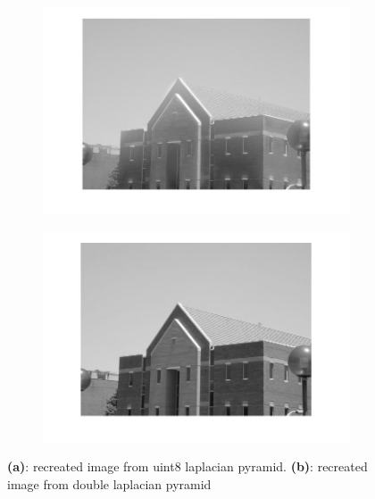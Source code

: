 \documentclass[a4paper]{iacas}
\begin{document}
\begin{figure}[!htbp]
	
	\begin{subfigure}[b]{0.48\textwidth}
		\includegraphics[width=\textwidth]{rec_1_building.jpg}
		\caption{}
		\label{fig:rec1b}
	\end{subfigure}
	\begin{subfigure}[b]{0.48\textwidth}
		\includegraphics[width=\textwidth]{rec_2_building.jpg}
		\caption{}
		\label{fig:rec2b}
	\end{subfigure}
	
	\caption{\textbf{(a)}: recreated image from uint8 laplacian pyramid. \textbf{(b)}: recreated image from double laplacian pyramid}
	
\end{figure}
\end{document}
